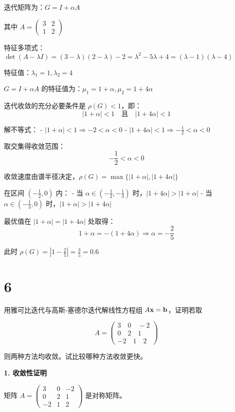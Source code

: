 \documentclass[11pt]{article}
\begin{document}
迭代矩阵为：\(G = I + \alpha A\)

其中 \(A = \begin{pmatrix} 3 & 2 \\ 1 & 2 \end{pmatrix}\)

特征多项式：\(\det(A - \lambda I) = (3-\lambda)(2-\lambda) - 2 = \lambda^2 - 5\lambda + 4 = (\lambda-1)(\lambda-4)\)

特征值：\(\lambda_1 = 1, \lambda_2 = 4\)

\(G = I + \alpha A\)
的特征值为：\(\mu_1 = 1 + \alpha, \mu_2 = 1 + 4\alpha\)

迭代收敛的充分必要条件是 \(\rho(G) < 1\)，即：
\[|1 + \alpha| < 1 \quad \text{且} \quad |1 + 4\alpha| < 1\]

解不等式： - \(|1 + \alpha| < 1 \Rightarrow -2 < \alpha < 0\) -
\(|1 + 4\alpha| < 1 \Rightarrow -\frac{1}{2} < \alpha < 0\)

取交集得收敛范围：\[-\frac{1}{2} < \alpha < 0\]

收敛速度由谱半径决定，\(\rho(G) = \max\{|1 + \alpha|, |1 + 4\alpha|\}\)

在区间 \((-\frac{1}{2}, 0)\) 内： - 当
\(\alpha \in (-\frac{1}{2}, -\frac{1}{3})\)
时，\(|1 + 4\alpha| > |1 + \alpha|\) - 当
\(\alpha \in (-\frac{1}{3}, 0)\) 时，\(|1 + \alpha| > |1 + 4\alpha|\)

最优值在 \(|1 + \alpha| = |1 + 4\alpha|\) 处取得：
\[1 + \alpha = -(1 + 4\alpha) \Rightarrow \alpha = -\frac{2}{5}\]

此时 \(\rho(G) = |1 - \frac{2}{5}| = \frac{3}{5} = 0.6\)

    \section{6}\label{section}

用雅可比迭代与高斯-塞德尔迭代解线性方程组
\(A\bold{x} = \bold{b}\)，证明若取

\[
A = \begin{pmatrix}
3 \quad 0 \quad -2 \\
0 \quad 2 \quad 1 \\
-2 \quad 1 \quad 2
\end{pmatrix}
\]

则两种方法均收敛。试比较哪种方法收敛更快。

    \textbf{1. 收敛性证明}

矩阵
\(A = \begin{pmatrix} 3 & 0 & -2 \\ 0 & 2 & 1 \\ -2 & 1 & 2 \end{pmatrix}\)
是对称矩阵。
\end{document}
